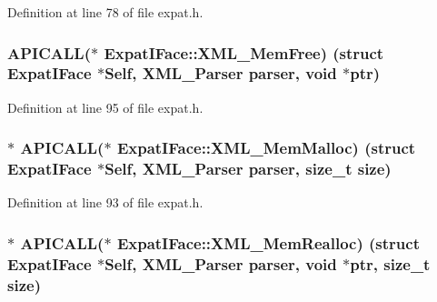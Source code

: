 Definition at line 78 of file expat.\+h.

\subsubsection[{\texorpdfstring{X\+M\+L\+\_\+\+Mem\+Free}{XML_MemFree}}]{ A\+P\+I\+C\+A\+LL($\ast$ Expat\+I\+Face\+::\+X\+M\+L\+\_\+\+Mem\+Free) (struct {\bf Expat\+I\+Face} $\ast$Self, {\bf X\+M\+L\+\_\+\+Parser} parser, {\bf void} $\ast$ptr)}\hypertarget{struct_expat_i_face_a9992c42432ca5351a17acd465db538c7}{}\label{struct_expat_i_face_a9992c42432ca5351a17acd465db538c7}


Definition at line 95 of file expat.\+h.

\subsubsection[{\texorpdfstring{X\+M\+L\+\_\+\+Mem\+Malloc}{XML_MemMalloc}}]{$\ast$ A\+P\+I\+C\+A\+LL($\ast$ Expat\+I\+Face\+::\+X\+M\+L\+\_\+\+Mem\+Malloc) (struct {\bf Expat\+I\+Face} $\ast$Self, {\bf X\+M\+L\+\_\+\+Parser} parser, size\+\_\+t {\bf size})}\hypertarget{struct_expat_i_face_a78462e78709dc34c8908fabcddb8ee6c}{}\label{struct_expat_i_face_a78462e78709dc34c8908fabcddb8ee6c}


Definition at line 93 of file expat.\+h.

\subsubsection[{\texorpdfstring{X\+M\+L\+\_\+\+Mem\+Realloc}{XML_MemRealloc}}]{$\ast$ A\+P\+I\+C\+A\+LL($\ast$ Expat\+I\+Face\+::\+X\+M\+L\+\_\+\+Mem\+Realloc) (struct {\bf Expat\+I\+Face} $\ast$Self, {\bf X\+M\+L\+\_\+\+Parser} parser, {\bf void} $\ast$ptr, size\+\_\+t {\bf size})}\hypertarget{struct_expat_i_face_adddb1fbb26cb51c3d967e8e5d3634460}{}\label{struct_expat_i_face_adddb1fbb26cb51c3d967e8e5d3634460}


